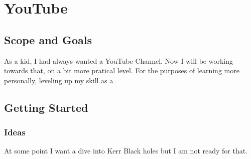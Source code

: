 \chapter{YouTube}

\section{Scope and Goals}

As a kid, I had always wanted a YouTube Channel. Now I will be working towards that, on a bit more pratical level. For the purposes of learning more personally, leveling up my skill as a

\section{Getting Started}

\subsection{Ideas}

At some point I want a dive into Kerr Black holes but I am not ready for that.

